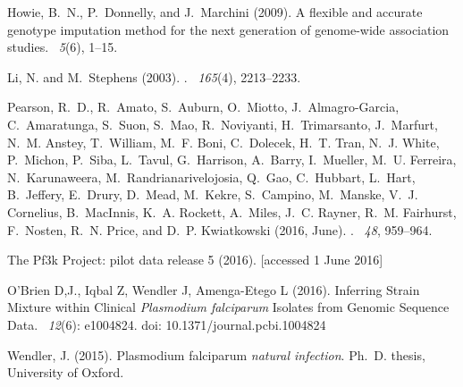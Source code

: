 \documentclass{bioinfo}
\begin{document}
\begin{thebibliography}{}
Howie, B.~N., P.~Donnelly, and J.~Marchini (2009).
\newblock A flexible and accurate genotype imputation method for the next
  generation of genome-wide association studies.
~{\em 5\/}(6), 1--15.

Li, N. and M.~Stephens (2003).
.
~{\em 165\/}(4), 2213--2233.

Pearson, R.~D., R.~Amato, S.~Auburn, O.~Miotto, J.~Almagro-Garcia,
  C.~Amaratunga, S.~Suon, S.~Mao, R.~Noviyanti, H.~Trimarsanto, J.~Marfurt,
  N.~M. Anstey, T.~William, M.~F. Boni, C.~Dolecek, H.~T. Tran, N.~J. White,
  P.~Michon, P.~Siba, L.~Tavul, G.~Harrison, A.~Barry, I.~Mueller, M.~U.
  Ferreira, N.~Karunaweera, M.~Randrianarivelojosia, Q.~Gao, C.~Hubbart,
  L.~Hart, B.~Jeffery, E.~Drury, D.~Mead, M.~Kekre, S.~Campino, M.~Manske,
  V.~J. Cornelius, B.~MacInnis, K.~A. Rockett, A.~Miles, J.~C. Rayner, R.~M.
  Fairhurst, F.~Nosten, R.~N. Price, and D.~P. Kwiatkowski (2016, June).
.
~{\em 48}, 959--964.

The Pf3k Project: pilot data release 5 (2016).
 [accessed 1 June 2016]

O'Brien D,J., Iqbal Z, Wendler J, Amenga-Etego L (2016). \newblock Inferring Strain Mixture within Clinical {\em Plasmodium falciparum} Isolates from Genomic Sequence Data. ~{\em 12\/}(6): e1004824. doi: 10.1371/journal.pcbi.1004824


Wendler, J. (2015).
 {P}lasmodium falciparum {\em natural infection}.
\newblock Ph.\ D. thesis, University of Oxford.


\end{thebibliography}
\end{document}
